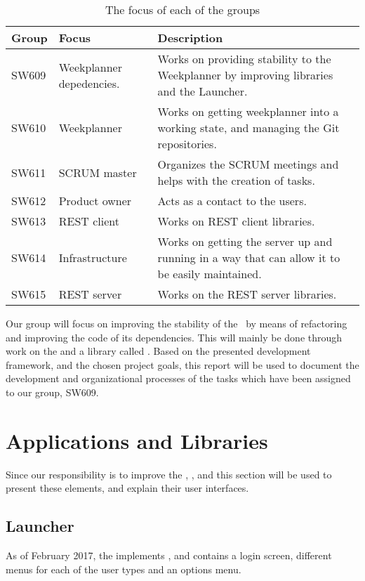 \begin{table}[H]
\centering
\begin{tabular}{|p{2cm}|p{3cm}|p{8cm}|}
\hline
Group & Focus & Description \\ \hline
SW609 & Weekplanner depedencies. & Works on providing
stability to the Weekplanner by improving libraries and the Launcher.\\\hline 
SW610 & Weekplanner & Works on getting weekplanner into a working
state, and managing the Git repositories.\\\hline 
SW611 & SCRUM master & Organizes the SCRUM meetings and helps with the creation of tasks. \\\hline 
SW612 & Product owner &  Acts as a contact to the users.\\\hline 
SW613 & REST client & Works on REST client libraries.\\ \hline

SW614 & Infrastructure & Works on getting the server up and running in a way
that can allow it to be easily maintained. \\\hline

SW615 & REST server & Works on the REST server libraries.\\ \hline

\end{tabular}
\caption{The focus of each of the groups}
\label{GroupDivision}
\end{table}

Our group will focus on improving the stability of the \wapp\ by means of
refactoring and improving the code of its dependencies. This will mainly be done
through work on the \lapp and a library called \plib. Based
on the presented development framework, and the chosen project goals, this
report will be used to document the development and organizational processes of
the tasks which have been assigned to our group, SW609.

\section{Applications and Libraries}
Since our responsibility is to improve the \lapp, \clib, and \plib this section
will be used to present these elements, and explain their user interfaces.

\subsection{Launcher}\label{LauncherReview}
As of February 2017, the \lapp implements \clib, and contains a login screen,
different menus for each of the user types and an options menu.

